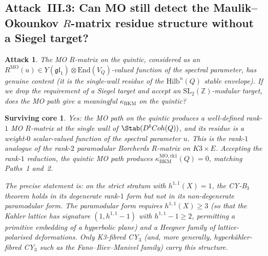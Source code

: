 \documentclass[11pt]{amsart}
\newtheorem{attack}[theorem]{Attack}
\newtheorem{surviving}[theorem]{Surviving core}
\providecommand{\Z}{\mathbb{Z}}
\providecommand{\SL}{\mathrm{SL}}
\providecommand{\Coh}{\mathrm{Coh}}
\providecommand{\MO}{\mathrm{MO}}
\providecommand{\kBKM}{\kappa_{\mathrm{BKM}}}
\providecommand{\End}{\mathrm{End}}
\providecommand{\Hilb}{\mathrm{Hilb}}
\begin{document}
\subsection{Attack~III.3: Can MO still detect the Maulik--Okounkov
$R$-matrix residue structure without a Siegel target?}

\begin{attack}
\label{att:mo-without-siegel}
The MO $R$-matrix on the quintic, considered as an $R^{\MO}(u) \in
Y(\mathfrak{gl}_1) \otimes \End(V_Q)$-valued function of the spectral
parameter, has genuine content (it is the single-wall residue of the
$\Hilb^n(Q)$ stable envelope). If we drop the requirement of a
Siegel target and accept an $\SL_2(\Z)$-modular target, does the MO
path give a meaningful $\kBKM$ on the quintic?
\end{attack}

\begin{surviving}
\label{surv:mo-rank-1-valid}
Yes: the MO path on the quintic produces a well-defined rank-$1$
MO $R$-matrix at the single wall of $\Stab(D^b\Coh(Q))$, and its
residue is a weight-$0$ scalar-valued function of the spectral
parameter $u$. This is the rank-$1$ analogue of the rank-$2$
paramodular Borcherds $R$-matrix on $K3 \times E$. Accepting the
rank-$1$ reduction, the quintic MO path produces
$\kBKM^{\MO,\mathrm{rk}1}(Q) = 0$, matching Paths~1 and~2.

The precise statement is: on the strict stratum with
$h^{1,1}(X) = 1$, the CY-B$_3$ theorem \emph{holds in its
degenerate rank-$1$ form} but \emph{not in its non-degenerate
paramodular form}. The paramodular form requires $h^{1,1}(X) \geq 3$
(so that the Kahler lattice has signature $(1, h^{1,1} - 1)$ with
$h^{1,1} - 1 \geq 2$, permitting a primitive embedding of a
hyperbolic plane) and a Heegner family of lattice-polarised
deformations. Only K3-fibred CY$_3$ (and, more generally,
hyperk\"ahler-fibred CY$_3$ such as the Fano--Iliev--Manivel family)
carry this structure.
\end{surviving}
\end{document}
